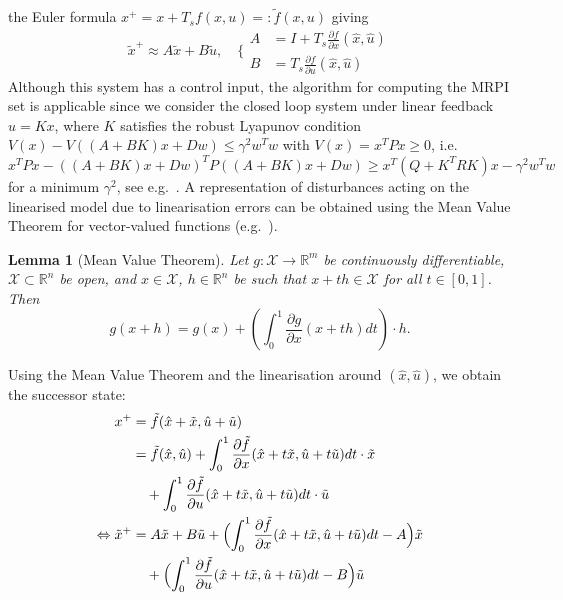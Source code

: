 \documentclass[letterpaper, 10pt, conference]{ieeeconf} %
\newtheorem{thm}{Lemma}[section]
\begin{document}
the Euler formula $x^+=x+T_s f(x,u) =:\tilde f(x,u)$ giving
\[
\tilde{x}^+ \approx A \tilde{x} + B \tilde{u}, \quad
\Biggl\{\begin{aligned} A &= I+T_s\frac{\partial f}{\partial  x}(\hat
  x,\hat u) \\
B &= T_s \frac{\partial f}{\partial u}(\hat x,\hat u)
\end{aligned}
\]
Although this system has a control input, the algorithm for computing the
MRPI set is applicable since we consider the closed loop system under
linear feedback  $u=Kx$, where $K$ satisfies the robust Lyapunov condition $V(x)-V((A+BK)x+Dw)\leq \gamma^2w^Tw$ with $V(x)=x^T P x\geq0$, i.e.
$x^TPx - ((A+BK)x+Dw)^TP((A+BK)x+Dw)\geq x^T(Q+K^TRK)x -\gamma^2 w^Tw$
for a minimum  $\gamma^2$, see e.g.~\cite{Boyd:94}.
A representation of disturbances acting on the linearised
model due to linearisation errors can be obtained using the
Mean Value Theorem for vector-valued functions (e.g.~\cite{Apostol:1974}).
%
%
\begin{thm}[Mean Value Theorem]\label{thm:mean:value:theorem}
Let $g : \mathcal X \rightarrow\mathbb R^m$ be continuously
differentiable, $\mathcal X\subset\mathbb R^n$ be open,
and $x \in\mathcal X$, $h \in\mathbb R^n$ be such that 
$x + th \in\mathcal X$ for all $t\in [0 ,1]$. Then
\begin{equation}
	g(x+h) = g(x) + \left(\int_0^1 \frac{\partial g}{\partial x}(x+th)dt\right)\cdot h.
\end{equation}
\end{thm}
%
%
Using the Mean Value Theorem
and the linearisation around $(\hat{x},\hat{u})$, we obtain the successor state:
%
\begin{align*}
x^+ &= \tilde{f}(\hat{x} + \tilde{x},\hat{u} + \tilde{u}) 
\\
&= \tilde f(\hat x, \hat u) 
+ \int_0^1\frac{\partial\tilde f}{\partial x}(\hat x + t\tilde x,
\hat u + t\tilde u) dt \cdot \tilde x  \\
&\quad + \int_0^1\frac{\partial\tilde f}{\partial u}(\hat x + t\tilde x,\hat u+
t\tilde u) dt\cdot \tilde u \\
\Leftrightarrow 
\tilde x^+ &= A\tilde{x} + B \tilde{u} +\Bigl(
\int_0^1\frac{\partial\tilde f}{\partial x}(\hat x + t\tilde x,\hat u
             + t\tilde u)dt - A \Bigr)\tilde x 
\\ 
&\quad +\Bigl(\int_0^1\frac{\partial\tilde f}{\partial u}(\hat x + t\tilde x,\hat u + t\tilde u)dt - B\Bigr)\tilde u
\end{align*}
\end{document}
